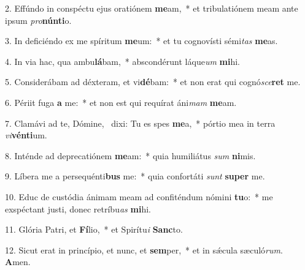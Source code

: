 2. Effúndo in conspéctu ejus oratiónem \textbf{me}am,~*  et tribulatiónem meam ante ipsum \textit{pro}\textbf{nún}\textbf{ti}o.\

3. In deficiéndo ex me spíritum \textbf{me}um:~*  et tu cognovísti sémi\textit{tas} \textbf{me}as.\

4. In via hac, qua ambu\textbf{lá}bam,~*  abscondérunt láque\textit{um} \textbf{mi}hi.\

5. Considerábam ad déxteram, et vi\textbf{dé}bam:~*  et non erat qui cognó\textit{sce}\textbf{ret} me.\

6. Périit fuga \textbf{a} me:~*  et non est qui requírat áni\textit{mam} \textbf{me}am.\

7. Clamávi ad te, Dómine, \dag\  dixi: Tu es spes \textbf{me}a,~*  pórtio mea in terra \textit{vi}\textbf{vén}\textbf{ti}um.\

8. Inténde ad deprecatiónem \textbf{me}am:~*  quia humiliátus \textit{sum} \textbf{ni}mis.\

9. Líbera me a persequénti\textbf{bus} me:~*  quia confortáti \textit{sunt} \textbf{su}\textbf{per} me.\

10. Educ de custódia ánimam meam ad confiténdum nómini \textbf{tu}o:~*  me exspéctant justi, donec retríbu\textit{as} \textbf{mi}hi.\

11. Glória Patri, et \textbf{Fí}lio,~*  et Spirítu\textit{i} \textbf{Sanc}to.\

12. Sicut erat in princípio, et nunc, et \textbf{sem}per,~*  et in sǽcula sæculó\textit{rum}. \textbf{A}men.\


